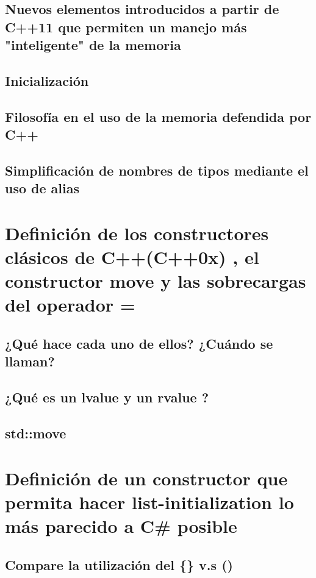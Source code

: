 \documentclass[10pt]{amsart}
\begin{document}
\subsection{Nuevos elementos introducidos a partir de C++11 que permiten un manejo más "inteligente" de la memoria}

\subsection{Inicializaci\'on}

\subsection{Filosofía en el uso de la memoria defendida por C++}

\subsection{Simplificaci\'on de nombres de tipos mediante el uso de alias}

\newpage
\section{Definici\'on de  los constructores clásicos de C++(C++0x) , el constructor move y las sobrecargas del operador =}

\subsection{¿Qué hace cada uno de ellos? ¿Cuándo se llaman?}

\subsection{¿Qué es un lvalue y un rvalue ?}

\subsection{std::move}

\newpage
\section{Definici\'on de un constructor que permita hacer list-initialization lo más parecido a C\# posible}

\subsection{Compare la utilización del \{\} v.s ()}
\end{document}
